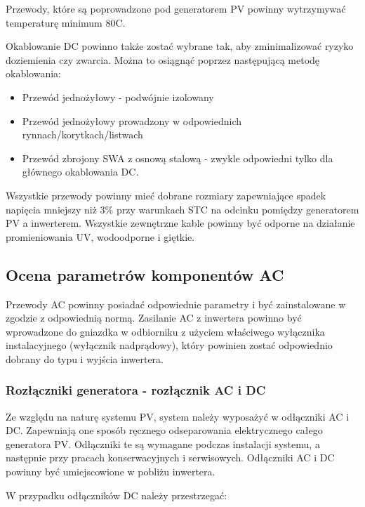 \documentclass[12pt,a4paper]{article}
\begin{document}
Przewody, które są poprowadzone pod generatorem PV powinny wytrzymywać 
temperaturę minimum 80\degree C. 

Okablowanie DC powinno także zostać wybrane tak, aby zminimalizować 
ryzyko doziemienia czy zwarcia. Można to osiągnąć poprzez następującą 
metodę okablowania: 

\begin{itemize}
\item Przewód jednożyłowy - podwójnie izolowany 
\item Przewód jednożyłowy prowadzony w odpowiednich 
rynnach/korytkach/listwach 
\item Przewód zbrojony SWA z osnową stalową - zwykle odpowiedni tylko 
dla głównego okablowania DC. 
\end{itemize}
Wszystkie przewody powinny mieć dobrane rozmiary zapewniające spadek 
napięcia mniejszy niż 3\% przy warunkach STC na odcinku pomiędzy 
generatorem PV a inwerterem. Wszystkie zewnętrzne kable powinny być 
odporne na działanie promieniowania UV, wodoodporne i giętkie.  

\subsection{Ocena parametrów komponentów AC }

Przewody AC powinny posiadać odpowiednie parametry i być zainstalowane w 
zgodzie z odpowiednią normą. Zasilanie AC z inwertera powinno być 
wprowadzone do gniazdka w odbiorniku z użyciem właściwego wyłącznika 
instalacyjnego (wyłącznik nadprądowy), który powinien zostać odpowiednio 
dobrany do typu i wyjścia inwertera. 
 

\subsubsection{Rozłączniki generatora - rozłącznik AC i DC }


Ze względu na naturę systemu PV, system należy wyposażyć w odłączniki AC 
i DC. Zapewniają one sposób ręcznego odseparowania elektrycznego całego 
generatora PV. Odłączniki te są wymagane podczas instalacji systemu, a 
następnie przy pracach konserwacyjnych i serwisowych. Odłączniki AC i DC 
powinny być umiejscowione w pobliżu inwertera. 

W przypadku odłączników DC należy przestrzegać: 
\end{document}
